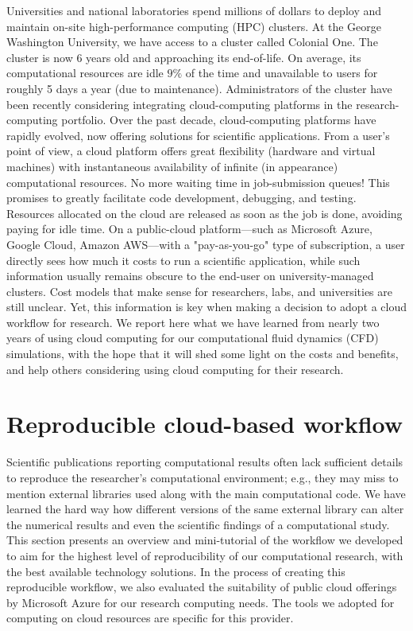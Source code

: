 \documentclass[10pt,journal,compsoc]{IEEEtran}
\begin{document}
Universities and national laboratories spend millions of dollars to deploy and maintain on-site high-performance computing (HPC) clusters.
At the George Washington University, we have access to a cluster called Colonial One.
The cluster is now $6$ years old and approaching its end-of-life.
On average, its computational resources are idle $9\%$ of the time and unavailable to users for roughly 5 days a year (due to maintenance).
Administrators of the cluster have been recently considering integrating cloud-computing platforms in the research-computing portfolio. 
Over the past decade, cloud-computing platforms have rapidly evolved, now offering solutions for scientific applications.
From a user's point of view, a cloud platform offers great flexibility (hardware and virtual machines) with instantaneous availability of infinite (in appearance) computational resources.
No more waiting time in job-submission queues!
This promises to greatly facilitate code development, debugging, and testing. Resources allocated on the cloud are released as soon as the job is done, avoiding paying for idle time.
On a public-cloud platform---such as Microsoft Azure, Google Cloud, Amazon AWS---with a "pay-as-you-go" type of subscription, a user directly sees how much it costs to run a scientific application, while such information usually remains obscure to the end-user on university-managed clusters. 
Cost models that make sense for researchers, labs, and universities are still unclear. 
Yet, this information is key when making a decision to adopt a cloud workflow for research. 
We report here what we have learned from nearly two years of using cloud computing for our computational fluid dynamics (CFD) simulations, with the hope that it will shed some light on the costs and benefits, and help others considering using cloud computing for their research.

\section{Reproducible cloud-based workflow}\label{sec:workflow}

Scientific publications reporting computational results often lack sufficient details to reproduce the researcher's computational environment; e.g., they may miss to mention external libraries used along with the main computational code.
We have learned the hard way how different versions of the same external library can alter the numerical results and even the scientific findings of a computational study\cite{mesnard_barba_2017}.
This section presents an overview and mini-tutorial of the workflow we developed to aim for the highest level of reproducibility of our computational research, with the best available technology solutions. 
In the process of creating this reproducible workflow, we also evaluated the suitability of public cloud offerings by Microsoft Azure for our research computing needs. 
The tools we adopted for computing on cloud resources are specific for this provider. 
\end{document}
